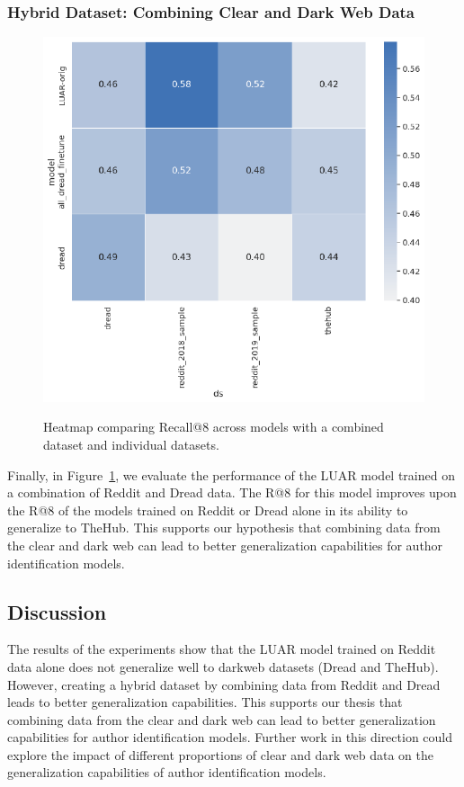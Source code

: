 \subsubsection{Hybrid Dataset: Combining Clear and Dark Web Data}
\begin{figure}
    \centering
    \includegraphics[width=0.8\linewidth,alt={Heatmap comparing Recall@8 with combined dataset.}]{stylometryExtensions/figures/results/rq3_combine} 
    \caption{Heatmap comparing Recall@8 across models with a combined dataset and individual datasets.}
    \label{fig:stylometry_extensions:followingTrail:results:rq3_combine}
\end{figure}

Finally, in Figure~\ref{fig:stylometry_extensions:followingTrail:results:rq3_combine}, we evaluate the performance of the LUAR model trained on a combination of Reddit and Dread data.
The R@8 for this model improves upon the R@8 of the models trained on Reddit or Dread alone in its ability to generalize to TheHub.
This supports our hypothesis that combining data from the clear and dark web can lead to better generalization capabilities for author identification models.

\subsection{Discussion}
The results of the experiments show that the LUAR model trained on Reddit data alone does not generalize well to darkweb datasets (Dread and TheHub).
However, creating a hybrid dataset by combining data from Reddit and Dread leads to better generalization capabilities.
This supports our thesis that combining data from the clear and dark web can lead to better generalization capabilities for author identification models.
Further work in this direction could explore the impact of different proportions of clear and dark web data on the generalization capabilities of author identification models.


\endinput